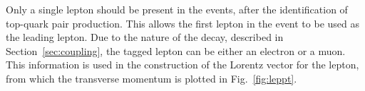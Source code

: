 \documentclass[12pt,a4paper]{article}
\numberwithin{equation}{section}
\begin{document}
Only a single lepton should be present in the events, after the identification
of top-quark pair production. This allows the first lepton in the event to
be used as the leading lepton. Due to the nature of the decay, described in
Section~\ref{sec:coupling}, the tagged lepton can be either an electron or a
muon. This information is used in the construction of the Lorentz vector for the
lepton, from which the transverse momentum is plotted in Fig.~\ref{fig:leppt}.\\
\end{document}

